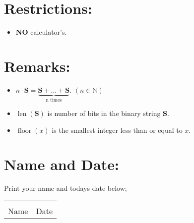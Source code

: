 \documentclass[12pt]{article} %
\begin{document}
	\section{Restrictions:}
  \begin{itemize}
		\item \textbf{NO} calculator's.
  \end{itemize}
  \section{Remarks:}
  \begin{itemize}
    \item $n\cdot \textbf{S} = \underbrace{\textbf{S} + \dots + \textbf{S}}_{\text{n times}}$. \hfill $(n \in
      \mathbb N)$
    \item $\operatorname{len}(\textbf{S})$ is number of bits in the binary string $\textbf{S}$.
    \item $\operatorname{floor}(x)$ is the smallest integer less than or equal to $x$.
  \end{itemize}
	\section{Name and Date:}
	Print your name and todays date below;

  \vspace*{0.4cm}

	\begin{center}
	\noindent\begin{tabular}{ll}
		\makebox[3in]{\hrulefill} & \makebox[3in]{\hrulefill}\\
		Name & Date\\[8ex]%
	\end{tabular}
	\end{center}
	\newpage
\end{document}
